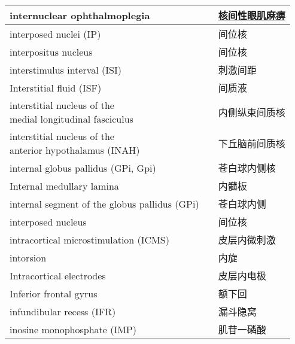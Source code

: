 \begin{longtable}{lll}
	\midrule
	internuclear ophthalmoplegia  && \href{https://chuangshi.qq.com/read/27611642/12}{核间性眼肌麻痹}  \\
	
	\midrule
	interposed nuclei (IP)  && 间位核  \\
	
	\midrule
	interpositus nucleus  && 间位核  \\
	
	\midrule
	interstimulus interval (ISI)  && 刺激间距  \\
	
	\midrule
	Interstitial fluid (ISF)  && 间质液  \\
	
	\midrule
	\makecell[l]{interstitial nucleus of the \\medial longitudinal fasciculus}   && 内侧纵束间质核  \\
	
	\midrule
	\makecell[l]{interstitial nucleus of the \\anterior hypothalamus  (INAH)} && 下丘脑前间质核  \\
	
	\midrule
	internal globus pallidus (GPi, Gpi)  && 苍白球内侧核  \\
	
	\midrule
	Internal medullary lamina  && 内髓板  \\
	
	\midrule
	internal segment of the globus pallidus (GPi) && 苍白球内侧  \\
	
	\midrule
	interposed nucleus && 间位核  \\
	
	\midrule
	intracortical microstimulation (ICMS)  && 皮层内微刺激  \\
	
	\midrule
	intorsion   && 内旋  \\
	
	\midrule
	Intracortical electrodes   && 皮层内电极  \\
	
	\midrule
	Inferior frontal gyrus   && 额下回  \\
	
	\midrule
	infundibular recess (IFR)   && 漏斗隐窝  \\
	
	\midrule
	inosine monophosphate (IMP)  && 肌苷一磷酸  \\
	

\end{longtable}
